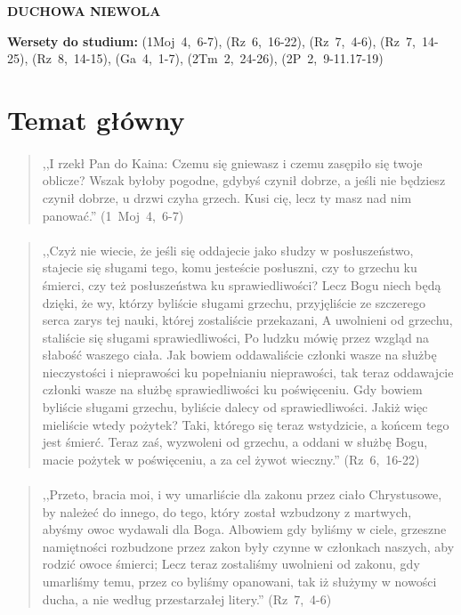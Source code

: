 \documentclass[10pt,a4paper,oneside]{article}
\begin{document}
\centerline{\textbf{\MakeUppercase{Duchowa niewola}}}
\begin{center}
\textbf{Wersety do studium:} \mbox{(1Moj 4, 6-7)}, \mbox{(Rz 6, 16-22)}, \mbox{(Rz 7, 4-6)}, \mbox{(Rz 7, 14-25)}, \mbox{(Rz 8, 14-15)}, \mbox{(Ga 4, 1-7)}, \mbox{(2Tm 2, 24-26)}, \mbox{(2P 2, 9-11.17-19)}
\end{center}
\section{Temat główny}
\paragraph{}
\begin{quote}
,,I rzekł Pan do Kaina: Czemu się gniewasz i czemu zasępiło się twoje oblicze? Wszak byłoby pogodne, gdybyś czynił dobrze, a jeśli nie będziesz czynił dobrze, u drzwi czyha grzech. Kusi cię, lecz ty masz nad nim panować.'' \mbox{(1 Moj 4, 6-7)}
\end{quote}
\paragraph{}
\begin{quote}
,,Czyż nie wiecie, że jeśli się oddajecie jako słudzy w posłuszeństwo, stajecie się sługami tego, komu jesteście posłuszni, czy to grzechu ku śmierci, czy też posłuszeństwa ku sprawiedliwości? Lecz Bogu niech będą dzięki, że wy, którzy byliście sługami grzechu, przyjęliście ze szczerego serca zarys tej nauki, której zostaliście przekazani, A uwolnieni od grzechu, staliście się sługami sprawiedliwości, Po ludzku mówię przez wzgląd na słabość waszego ciała. Jak bowiem oddawaliście członki wasze na służbę nieczystości i nieprawości ku popełnianiu nieprawości, tak teraz oddawajcie członki wasze na służbę sprawiedliwości ku poświęceniu. Gdy bowiem byliście sługami grzechu, byliście dalecy od sprawiedliwości. Jakiż więc mieliście wtedy pożytek? Taki, którego się teraz wstydzicie, a końcem tego jest śmierć. Teraz zaś, wyzwoleni od grzechu, a oddani w służbę Bogu, macie pożytek w poświęceniu, a za cel żywot wieczny.'' \mbox{(Rz 6, 16-22)}
\end{quote}
\paragraph{}
\begin{quote}
,,Przeto, bracia moi, i wy umarliście dla zakonu przez ciało Chrystusowe, by należeć do innego, do tego, który został wzbudzony z martwych, abyśmy owoc wydawali dla Boga. Albowiem gdy byliśmy w ciele, grzeszne namiętności rozbudzone przez zakon były czynne w członkach naszych, aby rodzić owoce śmierci; Lecz teraz zostaliśmy uwolnieni od zakonu, gdy umarliśmy temu, przez co byliśmy opanowani, tak iż służymy w nowości ducha, a nie według przestarzałej litery.'' \mbox{(Rz 7, 4-6)}
\end{quote}
\end{document}
